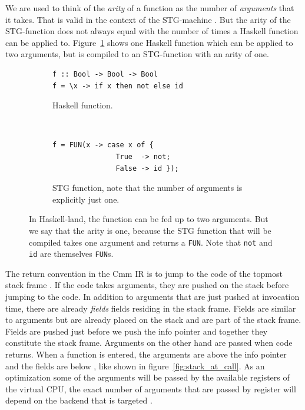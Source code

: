 We are used to think of the \emph{arity} of a function as the number
of \emph{arguments} that it takes. That is valid in the context
of the STG-machine \cite{commentary_function_calls}. But the arity
of the STG-function does not always equal with the number of times
a Haskell function can be applied to. Figure~\ref{fig:tricky_arity}
shows one Haskell function which can be applied to two arguments, but
is compiled to an STG-function with an arity of one.

\begin{figure}
\begin{mdframed}
        \begin{subfigure}[t]{0.5\textwidth}
          \begin{verbatim}
f :: Bool -> Bool -> Bool
f = \x -> if x then not else id
          \end{verbatim}
          \caption{Haskell function.}
        \end{subfigure}
    ~ %
        \begin{subfigure}[t]{0.5\textwidth}
          \begin{verbatim}
f = FUN(x -> case x of {
               True  -> not;
               False -> id });
          \end{verbatim}
          \caption{STG function, note that the number of arguments is
explicitly just one.}
        \end{subfigure}
  \caption{In Haskell-land, the function can be fed up to two arguments.
  But we say that the arity is one, because the STG function that will be
  compiled takes one argument and returns a \texttt{FUN}. Note that \texttt{not}
  and \texttt{id} are themselves \texttt{FUN}s.}
  \label{fig:tricky_arity}
\end{mdframed}
\end{figure}

The return convention in the Cmm IR is to jump to the code of the
topmost stack frame \cite{commentary_return_convention}. If the code
takes arguments, they are pushed on the stack before jumping to the
code. In addition to arguments that are just pushed at invocation time, there
are already \emph{fields} fields residing in the stack frame. Fields are
similar to arguments but are already placed on the stack and are part of
the stack frame. Fields are pushed just before we push the info pointer and
together they constitute the stack frame. Arguments on the other hand are
passed when code returns.
When a function is entered, the arguments are above the
info pointer and the fields are below \cite{github_stack_at_call}, like
shown in figure~\ref{fig:stack_at_call}. As an optimization some of the
arguments will be passed by the available registers of the virtual CPU,
the exact number of arguments that are passed by register will depend on
the backend that is targeted \cite{github_mach_regs_h}.

